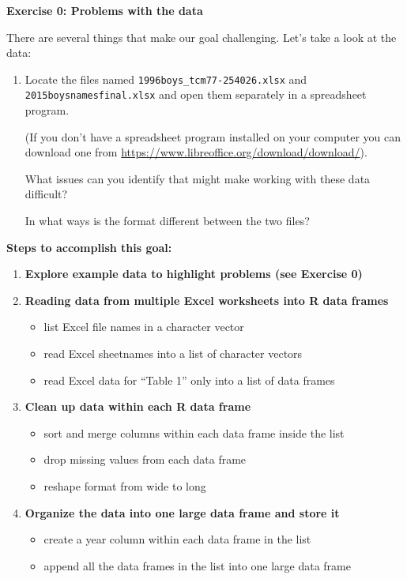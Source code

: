 \documentclass[]{book}
\providecommand{\tightlist}{%
  \setlength{\itemsep}{0pt}\setlength{\parskip}{0pt}}
\begin{document}
\textbf{Exercise 0: Problems with the data}

There are several things that make our goal challenging. Let's take a
look at the data:

\begin{enumerate}
\def\labelenumi{\arabic{enumi}.}
\item
  Locate the files named \texttt{1996boys\_tcm77-254026.xlsx} and
  \texttt{2015boysnamesfinal.xlsx} and open them separately in a
  spreadsheet program.

  (If you don't have a spreadsheet program installed on your computer
  you can download one from
  \url{https://www.libreoffice.org/download/download/}).

  What issues can you identify that might make working with these data
  difficult?

  In what ways is the format different between the two files?
\end{enumerate}

\textbf{Steps to accomplish this goal:}

\begin{enumerate}
\def\labelenumi{\arabic{enumi}.}
\setcounter{enumi}{-1}
\item
  \textbf{Explore example data to highlight problems (see Exercise 0)}
\item
  \textbf{Reading data from multiple Excel worksheets into R data
  frames}

  \begin{itemize}
  \tightlist
  \item
    list Excel file names in a character vector
  \item
    read Excel sheetnames into a list of character vectors
  \item
    read Excel data for ``Table 1'' only into a list of data frames
  \end{itemize}
\item
  \textbf{Clean up data within each R data frame}

  \begin{itemize}
  \tightlist
  \item
    sort and merge columns within each data frame inside the list
  \item
    drop missing values from each data frame
  \item
    reshape format from wide to long
  \end{itemize}
\item
  \textbf{Organize the data into one large data frame and store it}

  \begin{itemize}
  \tightlist
  \item
    create a year column within each data frame in the list
  \item
    append all the data frames in the list into one large data frame
  \end{itemize}
\end{enumerate}
\end{document}
